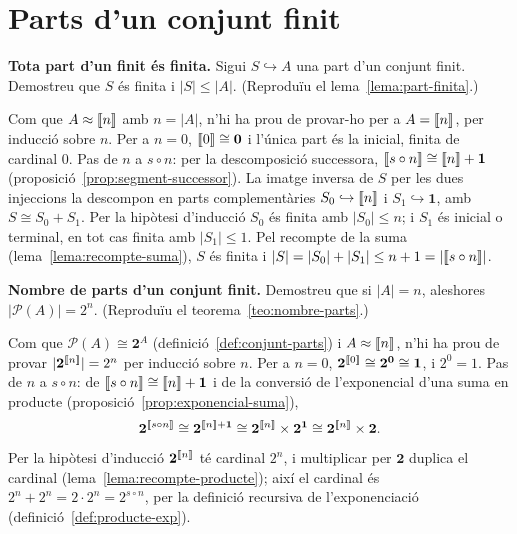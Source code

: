 \section{Parts d'un conjunt finit}\label{prac:parts-finites}

\begin{exercici}
\textbf{Tota part d'un finit és finita.} Sigui \(S\hookrightarrow A\) una part d'un conjunt finit. Demostreu que \(S\) és finita i \(|S|\le|A|\). (Reproduïu el lema~\ref{lema:part-finita}.)
\end{exercici}
\begin{solucio}
Com que \(A\approx\llbracket n\rrbracket\) amb \(n=|A|\), n'hi ha prou de provar-ho per a \(A=\llbracket n\rrbracket\), per inducció sobre \(n\). Per a \(n=0\), \(\llbracket 0\rrbracket\cong\mathbf0\) i l'única part és la inicial, finita de cardinal \(0\). Pas de \(n\) a \(s\circ n\): per la descomposició successora, \(\llbracket s\circ n\rrbracket\cong\llbracket n\rrbracket+\mathbf1\) (proposició~\ref{prop:segment-successor}). La imatge inversa de \(S\) per les dues injeccions la descompon en parts complementàries \(S_0\hookrightarrow\llbracket n\rrbracket\) i \(S_1\hookrightarrow\mathbf1\), amb \(S\cong S_0+S_1\). Per la hipòtesi d'inducció \(S_0\) és finita amb \(|S_0|\le n\); i \(S_1\) és inicial o terminal, en tot cas finita amb \(|S_1|\le1\). Pel recompte de la suma (lema~\ref{lema:recompte-suma}), \(S\) és finita i \(|S|=|S_0|+|S_1|\le n+1=|\llbracket s\circ n\rrbracket|\).
\end{solucio}

\begin{exercici}
\textbf{Nombre de parts d'un conjunt finit.} Demostreu que si \(|A|=n\), aleshores \(|\mathcal P(A)|=2^{n}\). (Reproduïu el teorema~\ref{teo:nombre-parts}.)
\end{exercici}
\begin{solucio}
Com que \(\mathcal P(A)\cong\mathbf2^{A}\) (definició~\ref{def:conjunt-parts}) i \(A\approx\llbracket n\rrbracket\), n'hi ha prou de provar \(|\mathbf2^{\llbracket n\rrbracket}|=2^{n}\) per inducció sobre \(n\). Per a \(n=0\), \(\mathbf2^{\llbracket 0\rrbracket}\cong\mathbf2^{\mathbf0}\cong\mathbf1\), i \(2^{0}=1\). Pas de \(n\) a \(s\circ n\): de \(\llbracket s\circ n\rrbracket\cong\llbracket n\rrbracket+\mathbf1\) i de la conversió de l'exponencial d'una suma en producte (proposició~\ref{prop:exponencial-suma}),
\[
\mathbf2^{\llbracket s\circ n\rrbracket}\cong\mathbf2^{\llbracket n\rrbracket+\mathbf1}\cong\mathbf2^{\llbracket n\rrbracket}\times\mathbf2^{\mathbf1}\cong\mathbf2^{\llbracket n\rrbracket}\times\mathbf2.
\]
Per la hipòtesi d'inducció \(\mathbf2^{\llbracket n\rrbracket}\) té cardinal \(2^{n}\), i multiplicar per \(\mathbf2\) duplica el cardinal (lema~\ref{lema:recompte-producte}); així el cardinal és \(2^{n}+2^{n}=2\cdot2^{n}=2^{s\circ n}\), per la definició recursiva de l'exponenciació (definició~\ref{def:producte-exp}).
\end{solucio}

